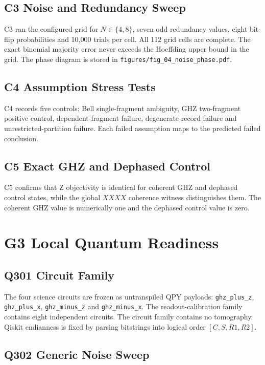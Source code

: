 \documentclass[11pt]{article}
\begin{document}
\subsection{C3 Noise and Redundancy Sweep}

C3 ran the configured grid for \(N\in\{4,8\}\), seven odd redundancy values,
eight bit-flip probabilities and 10,000 trials per cell. All 112 grid cells are
complete. The exact binomial majority error never exceeds the Hoeffding upper
bound in the grid. The phase diagram is stored in
\texttt{figures/fig_04_noise_phase.pdf}.

\subsection{C4 Assumption Stress Tests}

C4 records five controls: Bell single-fragment ambiguity, GHZ two-fragment
positive control, dependent-fragment failure, degenerate-record failure and
unrestricted-partition failure. Each failed assumption maps to the predicted
failed conclusion.

\subsection{C5 Exact GHZ and Dephased Control}

C5 confirms that Z objectivity is identical for coherent GHZ and dephased
control states, while the global \(XXXX\) coherence witness distinguishes them.
The coherent GHZ value is numerically one and the dephased control value is zero.

\section{G3 Local Quantum Readiness}

\subsection{Q301 Circuit Family}

The four science circuits are frozen as untranspiled QPY payloads:
\texttt{ghz\_plus\_z}, \texttt{ghz\_plus\_x}, \texttt{ghz\_minus\_z} and
\texttt{ghz\_minus\_x}. The readout-calibration family contains eight
independent circuits. The circuit family contains no tomography. Qiskit
endianness is fixed by parsing bitstrings into logical order
\([C,S,R1,R2]\).

\subsection{Q302 Generic Noise Sweep}
\end{document}
